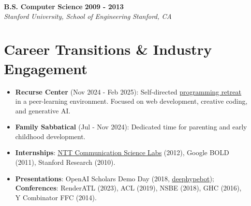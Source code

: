 \documentclass[10pt,letterpaper]{article}
\newcommand{\educationentry}[4]{
  \noindent\textbf{#1} \hfill \textbf{#2}\\
  \textit{#3} \hfill \textit{#4}
}
\begin{document}
\vspace{0.3em}

\educationentry{B.S. Computer Science}{2009 - 2013}{Stanford University, School of Engineering}{Stanford, CA}

\section{Career Transitions \& Industry Engagement}
\begin{itemize}
  \item \textbf{Recurse Center} (Nov 2024 - Feb 2025): Self-directed \href{https://www.recurse.com/}{programming retreat} in a peer-learning environment. Focused on web development, creative coding, and generative AI.
  \item \textbf{Family Sabbatical} (Jul - Nov 2024): Dedicated time for parenting and early childhood development.
  \item \textbf{Internships}: \href{https://www.rd.ntt/e/cs/}{NTT Communication Science Labs} (2012), Google BOLD (2011), Stanford Research (2010).
  \item \textbf{Presentations}: OpenAI Scholars Demo Day (2018, \href{https://youtu.be/-6Aq5Q0c-CU}{deephypebot}); \textbf{Conferences}: RenderATL (2023), ACL (2019), NSBE (2018), GHC (2016), Y Combinator FFC (2014).
\end{itemize}
\end{document}
